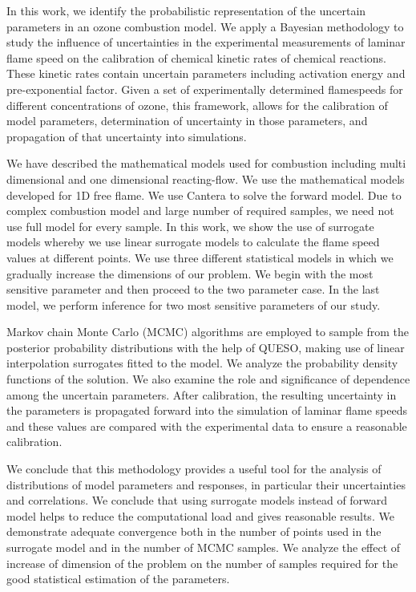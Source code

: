 

In this work, we identify the probabilistic representation of the uncertain parameters in an ozone combustion model. We  apply a Bayesian methodology to study the influence of
uncertainties in the experimental measurements of laminar flame speed on the calibration of chemical kinetic rates of chemical reactions. These kinetic rates contain uncertain parameters including activation energy and pre-exponential factor. Given a set of experimentally determined flamespeeds for different concentrations of ozone, this framework, allows for the
calibration of model parameters, determination of uncertainty in those parameters, and propagation
of that uncertainty into simulations.

\bigskip

We have described the mathematical models used for combustion including multi dimensional and one dimensional reacting-flow. We use the mathematical models developed for 1D free flame. We use Cantera to solve the forward model. Due to complex combustion model and large number of required samples, we need not use full model for every sample. In this work, we show the use of surrogate models whereby we use linear surrogate models to calculate the flame speed values at different points. We use three different statistical models in which we gradually increase the dimensions of our problem. We begin with the most sensitive parameter and then proceed to the two parameter case. In the last model, we perform inference for two most sensitive parameters of our study.  


\bigskip


Markov chain Monte Carlo (MCMC) 
algorithms are employed to sample from the posterior probability distributions with the help of QUESO, making use of
linear  interpolation surrogates fitted to the model. We analyze the  probability density functions of the solution. We
also examine the role and significance of dependence among the uncertain parameters. After calibration, the resulting uncertainty in the parameters is propagated forward into
the simulation of laminar flame speeds and these values are compared with the experimental data to ensure a reasonable calibration.


\bigskip



We conclude that this methodology provides a useful tool for the analysis of distributions of model parameters and
responses, in particular their uncertainties and correlations. We conclude that using surrogate models instead of forward model helps to reduce the computational load and gives reasonable results. We demonstrate adequate convergence both in the number of points used in the surrogate model and in the number of MCMC samples. We analyze the effect of increase of dimension of the problem on the number of samples required for the good statistical estimation of the parameters. 
